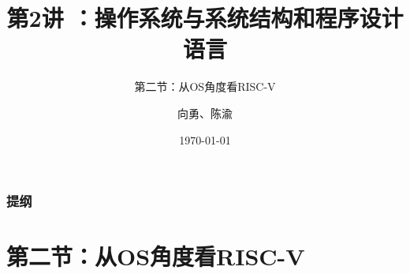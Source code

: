 


\title[第2讲]{第2讲 ：操作系统与系统结构和程序设计语言} %
\subtitle{第二节：从OS角度看RISC-V}
\author{向勇、陈渝} %
\date{\today} %



\begin{frame}
\titlepage %
\end{frame}

\begin{frame}
\frametitle{提纲} %
\tableofcontents %
\end{frame}


\section{第二节：从OS角度看RISC-V } %

